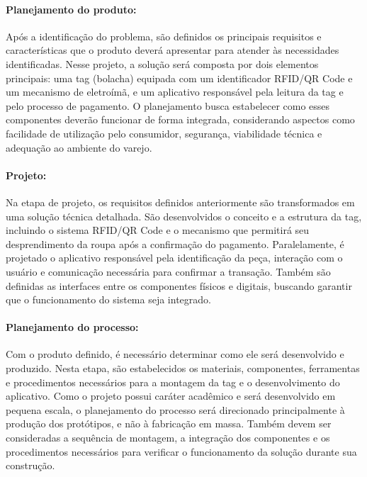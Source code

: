 \paragraph{Planejamento do produto:}
\label{par:planejamento_produto}

Após a identificação do problema, são definidos os principais requisitos e características que o produto deverá apresentar para atender às necessidades identificadas. Nesse projeto, a solução será composta por dois elementos principais: uma tag (bolacha) equipada com um identificador RFID/QR Code e um mecanismo de eletroímã, e um aplicativo responsável pela leitura da tag e pelo processo de pagamento. O planejamento busca estabelecer como esses componentes deverão funcionar de forma integrada, considerando aspectos como facilidade de utilização pelo consumidor, segurança, viabilidade técnica e adequação ao ambiente do varejo.

\paragraph{Projeto:}
\label{par:projeto}

Na etapa de projeto, os requisitos definidos anteriormente são transformados em uma solução técnica detalhada. São desenvolvidos o conceito e a estrutura da tag, incluindo o sistema RFID/QR Code e o mecanismo que permitirá seu desprendimento da roupa após a confirmação do pagamento. Paralelamente, é projetado o aplicativo responsável pela identificação da peça, interação com o usuário e comunicação necessária para confirmar a transação. Também são definidas as interfaces entre os componentes físicos e digitais, buscando garantir que o funcionamento do sistema seja integrado.

\paragraph{Planejamento do processo:}
\label{par:planejamento_processo}

Com o produto definido, é necessário determinar como ele será desenvolvido e produzido. Nesta etapa, são estabelecidos os materiais, componentes, ferramentas e procedimentos necessários para a montagem da tag e o desenvolvimento do aplicativo. Como o projeto possui caráter acadêmico e será desenvolvido em pequena escala, o planejamento do processo será direcionado principalmente à produção dos protótipos, e não à fabricação em massa. Também devem ser consideradas a sequência de montagem, a integração dos componentes e os procedimentos necessários para verificar o funcionamento da solução durante sua construção.

